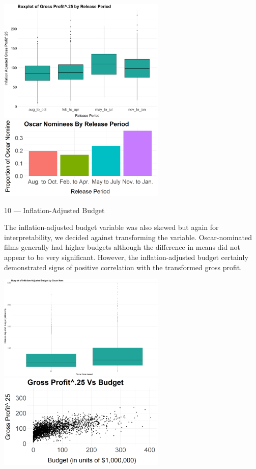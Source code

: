 \documentclass[10pt]{article}
\begin{document}
\begin{center}
\includegraphics[width=8cm]{_assets/_eda/releaseperiod_iagp_bp.png}
\hspace{1cm}
\includegraphics[width=8cm]{_assets/_eda/on_by_release_period.png}

\end{center}
	
10 --- Inflation-Adjusted Budget

The inflation-adjusted budget variable was also skewed but again for interpretability, we decided against transforming the variable. Oscar-nominated films generally had higher budgets although the difference in means did not appear to be very significant. However, the inflation-adjusted budget certainly demonstrated signs of positive correlation with the transformed gross profit.

\begin{center}
\includegraphics[width=8cm]{_assets/_eda/budget_on.png}
\hspace{1cm}
\includegraphics[width=8cm]{_assets/_eda/budget_v_profit25_corr_plot.png}
\end{center}
\end{document}
